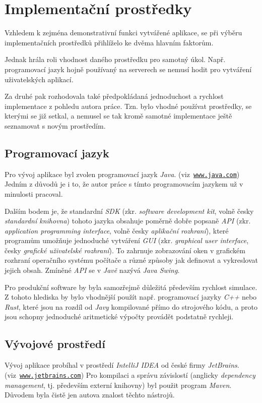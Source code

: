 \section{Implementační prostředky}

Vzhledem k zejména demonstrativní funkci vytvářené aplikace, se při výběru implementačních prostředků přihlíželo ke dvěma hlavním faktorům.

Jednak hrála roli vhodnost daného prostředku pro samotný úkol. Např. programovací jazyk hojně používaný na serverech se nemusí hodit pro vytváření uživatelských aplikací.

Za druhé pak rozhodovala také předpokládaná jednoduchost a rychlost implementace z pohledu autora práce. Tzn. bylo vhodné používat prostředky, se kterými se již setkal, a nemusel se tak kromě samotné implementace ještě seznamovat s novým prostředím.

\subsection{Programovací jazyk}

\begin{sloppypar}
Pro vývoj aplikace byl zvolen programovací jazyk \emph{Java}. (viz~\texttt{\href{https://www.java.com/}{www.java.com}}) Jedním z důvodů je i to, že autor práce s tímto programovacím jazykem už v minulosti pracoval.
\end{sloppypar}

Dalším bodem je, že standardní \emph{SDK} (zkr. \emph{software development kit}, volně česky \emph{standardní knihovna}) tohoto jazyka obsahuje poměrně dobře popsaně \emph{API} (zkr. \emph{application programming interface}, volně česky \emph{aplikační rozhraní}), které programům umožňuje jednoduché vytváření \emph{GUI} (zkr. \emph{graphical user interface}, česky \emph{grafické uživatelské rozhraní}). To zahrnuje zobrazování oken v grafickém rozhraní operačního systému počítače a různé způsoby jak definovat a vykreslovat jejich obsah. Zmíněné \emph{API} se v \emph{Javě} nazývá \emph{Java Swing}.

Pro produkční software by byla samozřejmě důležitá především rychlost simulace. Z tohoto hlediska by bylo vhodnější použít např. programovací jazyky \emph{C++} nebo \emph{Rust}, které jsou na rozdíl od \emph{Javy} kompilované přímo do strojového kódu, a proto jsou schopny jednoduché aritmetické výpočty provádět podstatně rychleji.

\subsection{Vývojové prostředí}

\begin{sloppypar}
Vývoj aplikace probíhal v prostředí \emph{IntelliJ IDEA} od české firmy \emph{JetBrains}. (viz~\texttt{\href{https://www.jetbrains.com/}{www.jetbrains.com}}) Pro kompilaci a správu závislostí (anglicky \emph{dependency management}, tj. především externí knihovny) byl použit program \emph{Maven}. Důvodem byla čistě jen autova znalost těchto nástrojů. 
\end{sloppypar}
